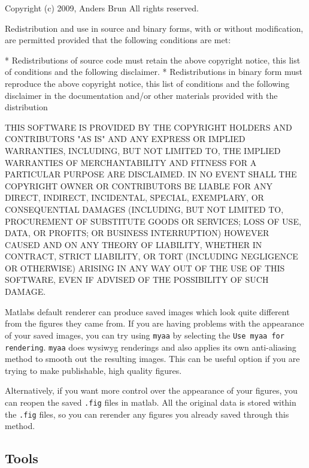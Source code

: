 \documentclass[11pt]{report}
\begin{document}
\begin{mdframed}[backgroundcolor = black!10]

Copyright (c) 2009, Anders Brun
All rights reserved.

Redistribution and use in source and binary forms, with or without
modification, are permitted provided that the following conditions are
met:

    * Redistributions of source code must retain the above copyright
      notice, this list of conditions and the following disclaimer.
    * Redistributions in binary form must reproduce the above copyright
      notice, this list of conditions and the following disclaimer in
      the documentation and/or other materials provided with the distribution

THIS SOFTWARE IS PROVIDED BY THE COPYRIGHT HOLDERS AND CONTRIBUTORS "AS IS"
AND ANY EXPRESS OR IMPLIED WARRANTIES, INCLUDING, BUT NOT LIMITED TO, THE
IMPLIED WARRANTIES OF MERCHANTABILITY AND FITNESS FOR A PARTICULAR PURPOSE
ARE DISCLAIMED. IN NO EVENT SHALL THE COPYRIGHT OWNER OR CONTRIBUTORS BE
LIABLE FOR ANY DIRECT, INDIRECT, INCIDENTAL, SPECIAL, EXEMPLARY, OR
CONSEQUENTIAL DAMAGES (INCLUDING, BUT NOT LIMITED TO, PROCUREMENT OF
SUBSTITUTE GOODS OR SERVICES; LOSS OF USE, DATA, OR PROFITS; OR BUSINESS
INTERRUPTION) HOWEVER CAUSED AND ON ANY THEORY OF LIABILITY, WHETHER IN
CONTRACT, STRICT LIABILITY, OR TORT (INCLUDING NEGLIGENCE OR OTHERWISE)
ARISING IN ANY WAY OUT OF THE USE OF THIS SOFTWARE, EVEN IF ADVISED OF THE
POSSIBILITY OF SUCH DAMAGE.

\end{mdframed}

Matlabs default renderer can produce saved images which look quite different from the figures they came from.  If you are having problems with the appearance of your saved images, you can try using \texttt{myaa} by selecting the \texttt{Use myaa for rendering}.  \texttt{myaa} does wysiwyg renderings and also applies its own anti-aliasing method to smooth out the resulting images.  This can be useful option if you are trying to make publishable, high quality figures.

Alternatively, if you want more control over the appearance of your figures, you can reopen the saved \texttt{.fig} files in matlab.  All the original data is stored within the \texttt{.fig} files, so you can rerender any figures you already saved through this method.

\subsection{Tools}
\end{document}
